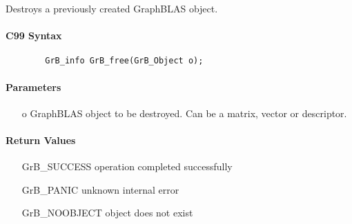 Destroys a previously created GraphBLAS object.

\paragraph{C99 Syntax}

\begin{verbatim}
        GrB_info GrB_free(GrB_Object o);
\end{verbatim}


\paragraph{Parameters}

\begin{itemize}[leftmargin=1.1in]
	\item[{\sf o}] GraphBLAS object to be destroyed. Can be a matrix, vector or descriptor.
\end{itemize}

\paragraph{Return Values}

\begin{itemize}[leftmargin=2.1in]
\item[{\sf GrB\_SUCCESS}]        operation completed successfully
\item[{\sf GrB\_PANIC}]          unknown internal error
\item[{\sf GrB\_NOOBJECT}]       object does not exist
\end{itemize}
